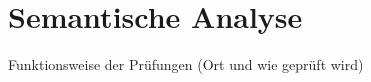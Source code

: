 \chapter{Semantische Analyse} \label{chap:semantic}

Funktionsweise der Prüfungen (Ort und wie geprüft wird)\\